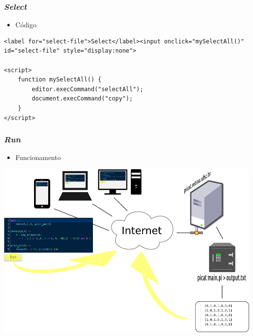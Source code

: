 \documentclass[brazil]{beamer}
\begin{document}
\begin{frame}[fragile]

    \frametitle{\textit{Select}}

    \begin{itemize}
      \item Código
    \end{itemize}

\begin{lstlisting}
<label for="select-file">Select</label><input onclick="mySelectAll()" id="select-file" style="display:none">

<script>
    function mySelectAll() {
        editor.execCommand("selectAll");
        document.execCommand("copy");
    }
</script>
\end{lstlisting}

\end{frame}



\begin{frame}

    \frametitle{\textit{Run}}

    \begin{itemize}
      \item Funcionamento
    \end{itemize}

\begin{center}
\includegraphics[width=.8\textwidth]{figures/func-run.pdf}
\end{center}

\end{frame}
\end{document}
